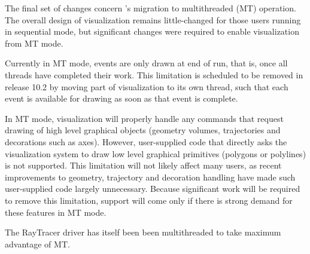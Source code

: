 
The final set of changes concern \Gfour{}'s migration to multithreaded (MT) 
operation.  The overall design of visualization remains little-changed for 
those users running in sequential mode, but significant changes were required 
to enable visualization from MT mode.

Currently in MT mode, events are only drawn at end of run, that is, once all
threads have completed their work.  This limitation is scheduled to be removed
in release 10.2 by moving part of visualization to its own thread, such that 
each event is available for drawing as soon as that event is complete.

In MT mode, visualization will properly handle any commands that request drawing
of high level graphical objects (geometry volumes, trajectories and decorations
such as axes).  However, user-supplied code that directly asks the visualization 
system to draw low level graphical primitives (polygons or polylines) is not 
supported.  This limitation will not likely affect many \Gfour{} users, as 
recent improvements to geometry, trajectory and decoration handling have made 
such user-supplied code largely unnecessary.  Because significant work will be 
required to remove this limitation, support will come only if there is strong 
demand for these features in MT mode.

The RayTracer driver has itself been been multithreaded to take maximum 
advantage of MT.

